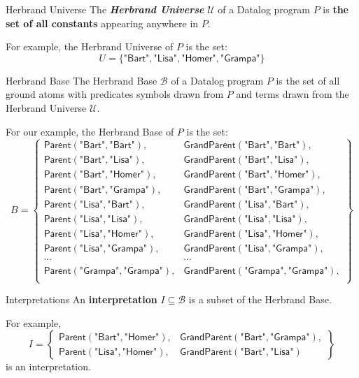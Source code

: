 \begin{frame}{Herbrand Universe}
The \textbf{\emph{Herbrand Universe}} $\mathcal{U}$ of a Datalog program $P$ is
\textbf{the set of all constants} appearing anywhere in $P$.

For example, the Herbrand Universe of $P$ is the set:
%
\Large
$$
U = \{ \textsf{"Bart"}, \textsf{"Lisa"}, \textsf{"Homer"}, \textsf{"Grampa"} \}
$$
\end{frame}

\begin{frame}{Herbrand Base}
The Herbrand Base $\mathcal{B}$ of a Datalog program $P$ is the set of all
ground atoms with predicates symbols drawn from $P$ and terms drawn from the
Herbrand Universe $\mathcal{U}$.

For our example, the Herbrand Base of $P$ is the set:
\small
$$
B = \left\{
\begin{array}{ll}
\textsf{Parent}(\textsf{"Bart"}, \textsf{"Bart"}),      & \textsf{GrandParent}(\textsf{"Bart"}, \textsf{"Bart"}), \\
\textsf{Parent}(\textsf{"Bart"}, \textsf{"Lisa"}),      & \textsf{GrandParent}(\textsf{"Bart"}, \textsf{"Lisa"}), \\
\textsf{Parent}(\textsf{"Bart"}, \textsf{"Homer"}),     & \textsf{GrandParent}(\textsf{"Bart"}, \textsf{"Homer"}), \\
\textsf{Parent}(\textsf{"Bart"}, \textsf{"Grampa"}),    & \textsf{GrandParent}(\textsf{"Bart"}, \textsf{"Grampa"}), \\
\textsf{Parent}(\textsf{"Lisa"}, \textsf{"Bart"}),      & \textsf{GrandParent}(\textsf{"Lisa"}, \textsf{"Bart"}), \\
\textsf{Parent}(\textsf{"Lisa"}, \textsf{"Lisa"}),      & \textsf{GrandParent}(\textsf{"Lisa"}, \textsf{"Lisa"}), \\
\textsf{Parent}(\textsf{"Lisa"}, \textsf{"Homer"}),     & \textsf{GrandParent}(\textsf{"Lisa"}, \textsf{"Homer"}), \\
\textsf{Parent}(\textsf{"Lisa"}, \textsf{"Grampa"}),    & \textsf{GrandParent}(\textsf{"Lisa"}, \textsf{"Grampa"}), \\
\cdots & \cdots \\ 
\textsf{Parent}(\textsf{"Grampa"}, \textsf{"Grampa"}),  & \textsf{GrandParent}(\textsf{"Grampa"}, \textsf{"Grampa"}), \\
\end{array}\right\}
$$
\end{frame}

\begin{frame}{Interpretations}
An \textbf{interpretation} $I \subseteq \mathcal{B}$ is a subset of the Herbrand
Base.

For example,
$$
I = \left\{
\begin{array}{ll}
\textsf{Parent}(\textsf{"Bart"}, \textsf{"Homer"}),      & \textsf{GrandParent}(\textsf{"Bart"}, \textsf{"Grampa"}), \\
\textsf{Parent}(\textsf{"Lisa"}, \textsf{"Homer"}),      & \textsf{GrandParent}(\textsf{"Bart"}, \textsf{"Lisa"})
\end{array}\right\}
$$
is an interpretation.
\end{frame}

